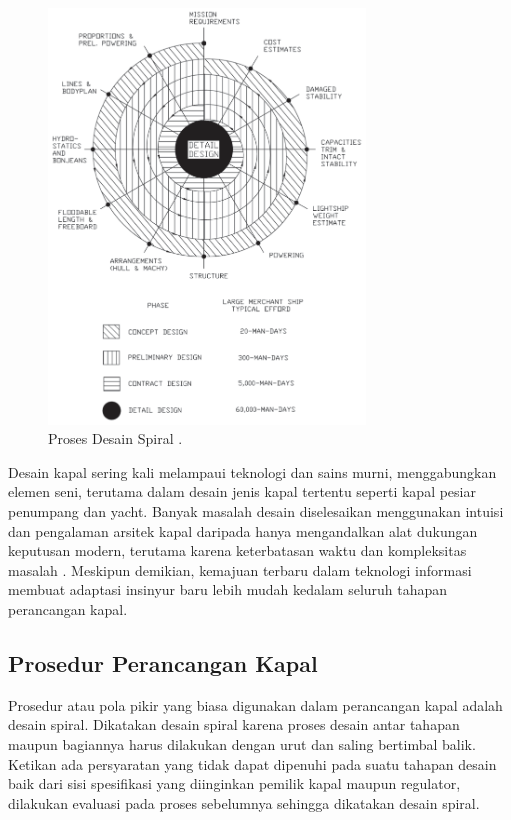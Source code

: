 \begin{figure}[ht]
  \centering
  \includegraphics[width=0.75\textwidth,keepaspectratio]{gambar/design-spiral.png}
  \caption{Proses Desain Spiral \citep{Taggart_1980}.}
  \label{fig:design-spiral}
\end{figure}

Desain kapal sering kali melampaui teknologi dan sains murni, menggabungkan elemen seni, terutama dalam desain jenis kapal tertentu seperti kapal pesiar penumpang dan yacht. Banyak masalah desain diselesaikan menggunakan intuisi dan pengalaman arsitek kapal daripada hanya mengandalkan alat dukungan keputusan modern, terutama karena keterbatasan waktu dan kompleksitas masalah \citep{Papanikolaou_2014}. Meskipun demikian, kemajuan terbaru dalam teknologi informasi membuat adaptasi insinyur baru lebih mudah kedalam seluruh tahapan perancangan kapal.


\subsection{Prosedur Perancangan Kapal}
\label{prosedural-deskap}

Prosedur atau pola pikir yang biasa digunakan dalam perancangan kapal adalah desain spiral. Dikatakan desain spiral karena proses desain antar tahapan maupun bagiannya harus dilakukan dengan urut dan saling bertimbal balik. Ketikan ada persyaratan yang tidak dapat dipenuhi pada suatu tahapan desain baik dari sisi spesifikasi yang diinginkan pemilik kapal maupun regulator, dilakukan evaluasi pada proses sebelumnya sehingga dikatakan desain spiral.


